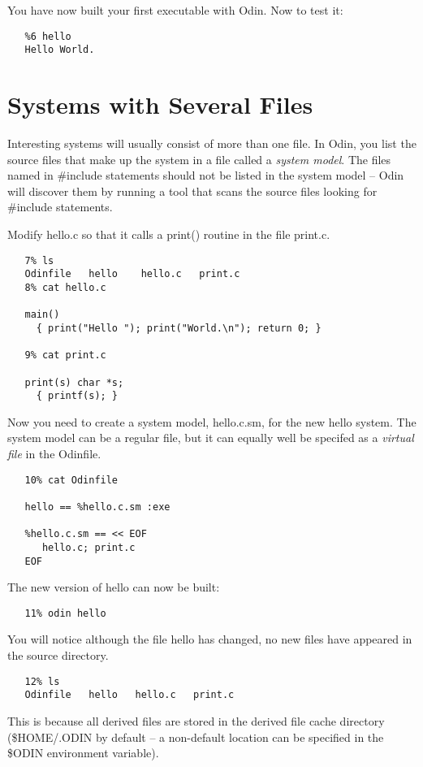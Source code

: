 You have now built your first executable with Odin.  Now to test it:
\begin{verbatim}
   %6 hello
   Hello World.
\end{verbatim}


\section{Systems with Several Files}

Interesting systems will usually consist of more than one file.
In Odin, you list the source files that make up the system in a
file called a {\em system model}.
The files named in {\ex \#include} statements
should not be listed in the system model --
Odin will discover them by running a tool
that scans the source files looking for {\ex \#include} statements.

Modify {\ex hello.c} so that it calls a {\ex print()}
routine in the file {\ex print.c}.
\begin{verbatim}
   7% ls
   Odinfile   hello    hello.c   print.c
   8% cat hello.c

   main()
     { print("Hello "); print("World.\n"); return 0; }

   9% cat print.c

   print(s) char *s;
     { printf(s); }
\end{verbatim}
Now you need to create a system model, {\ex hello.c.sm},
for the new {\ex hello} system.
The system model can be a regular file,
but it can equally well be specifed as a {\em virtual file}
in the {\ex Odinfile}.
\begin{verbatim}
   10% cat Odinfile

   hello == %hello.c.sm :exe

   %hello.c.sm == << EOF
      hello.c; print.c
   EOF
\end{verbatim}
The new version of {\ex hello} can now be built:
\begin{verbatim}
   11% odin hello
\end{verbatim}
You will notice although the file {\ex hello} has changed,
no new files have appeared in the source directory.
\begin{verbatim}
   12% ls
   Odinfile   hello   hello.c   print.c
\end{verbatim}
This is because all derived files are stored in the derived file cache
directory ({\ex \$HOME/.ODIN} by default -- a non-default location can be
specified in the {\ex \$ODIN} environment variable).

